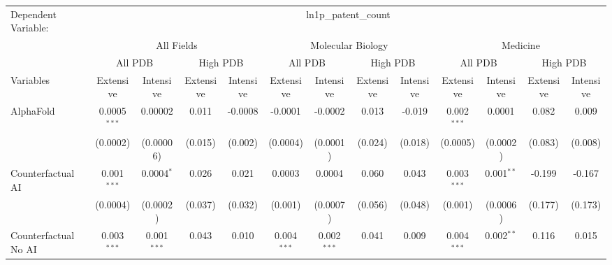 \begingroup
\centering
\begin{tabular}{lcccccccccccc}
   \tabularnewline \midrule \midrule
   Dependent Variable: & \multicolumn{12}{c}{ln1p\_patent\_count}\\
 & \multicolumn{4}{c}{All Fields} & \multicolumn{4}{c}{Molecular Biology} & \multicolumn{4}{c}{Medicine} \\
\cmidrule(lr){2-5} \cmidrule(lr){6-9} \cmidrule(lr){10-13}
 & \multicolumn{2}{c}{All PDB} & \multicolumn{2}{c}{High PDB} & \multicolumn{2}{c}{All PDB} & \multicolumn{2}{c}{High PDB} & \multicolumn{2}{c}{All PDB} & \multicolumn{2}{c}{High PDB} \\
\cmidrule(lr){2-3} \cmidrule(lr){4-5} \cmidrule(lr){6-7} \cmidrule(lr){8-9} \cmidrule(lr){10-11} \cmidrule(lr){12-13}
Variables & \multicolumn{1}{c}{Extensive} & \multicolumn{1}{c}{Intensive} & \multicolumn{1}{c}{Extensive} & \multicolumn{1}{c}{Intensive} & \multicolumn{1}{c}{Extensive} & \multicolumn{1}{c}{Intensive} & \multicolumn{1}{c}{Extensive} & \multicolumn{1}{c}{Intensive} & \multicolumn{1}{c}{Extensive} & \multicolumn{1}{c}{Intensive} & \multicolumn{1}{c}{Extensive} & \multicolumn{1}{c}{Intensive} \\
\cmidrule(lr){1-1}\cmidrule(lr){2-2} \cmidrule(lr){3-3} \cmidrule(lr){4-4} \cmidrule(lr){5-5} \cmidrule(lr){6-6} \cmidrule(lr){7-7} \cmidrule(lr){8-8} \cmidrule(lr){9-9} \cmidrule(lr){10-10} \cmidrule(lr){11-11} \cmidrule(lr){12-12} \cmidrule(lr){13-13}
   AlphaFold                                & 0.0005$^{***}$ & 0.00002        & 0.011   & -0.0008  & -0.0001        & -0.0002        & 0.013   & -0.019  & 0.002$^{***}$ & 0.0001       & 0.082   & 0.009\\   
                                            & (0.0002)       & (0.00006)      & (0.015) & (0.002)  & (0.0004)       & (0.0001)       & (0.024) & (0.018) & (0.0005)      & (0.0002)     & (0.083) & (0.008)\\   
   Counterfactual AI                        & 0.001$^{***}$  & 0.0004$^{*}$   & 0.026   & 0.021    & 0.0003         & 0.0004         & 0.060   & 0.043   & 0.003$^{***}$ & 0.001$^{**}$ & -0.199  & -0.167\\   
                                            & (0.0004)       & (0.0002)       & (0.037) & (0.032)  & (0.001)        & (0.0007)       & (0.056) & (0.048) & (0.001)       & (0.0006)     & (0.177) & (0.173)\\   
   Counterfactual No AI                     & 0.003$^{***}$  & 0.001$^{***}$  & 0.043   & 0.010    & 0.004$^{***}$  & 0.002$^{***}$  & 0.041   & 0.009   & 0.004$^{***}$ & 0.002$^{**}$ & 0.116   & 0.015\\   

\end{tabular}
